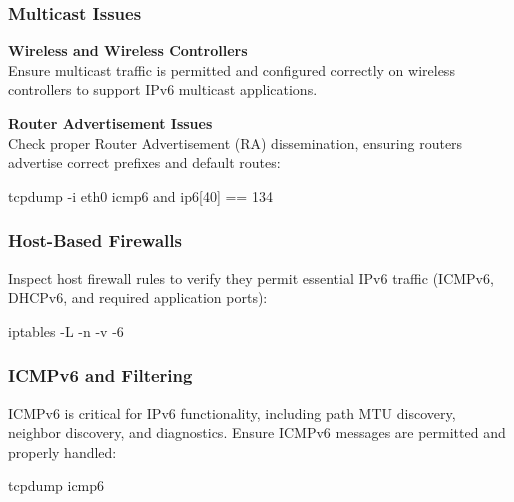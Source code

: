 \documentclass[
]{article}
\newenvironment{Shaded}{}{}
\newcommand{\AttributeTok}[1]{\textcolor[rgb]{0.49,0.56,0.16}{#1}}
\newcommand{\ExtensionTok}[1]{#1}
\newcommand{\NormalTok}[1]{#1}
\newcommand{\PreprocessorTok}[1]{\textcolor[rgb]{0.74,0.48,0.00}{#1}}
\newcommand{\SpecialStringTok}[1]{\textcolor[rgb]{0.73,0.40,0.53}{#1}}
\begin{document}
\subsubsection{Multicast Issues}\label{multicast-issues}

\textbf{Wireless and Wireless Controllers}\\
Ensure multicast traffic is permitted and configured correctly on
wireless controllers to support IPv6 multicast applications.

\textbf{Router Advertisement Issues}\\
Check proper Router Advertisement (RA) dissemination, ensuring routers
advertise correct prefixes and default routes:

\begin{Shaded}
\begin{Highlighting}[]
\ExtensionTok{tcpdump} \AttributeTok{{-}i}\NormalTok{ eth0 icmp6 and ip6}\PreprocessorTok{[}\SpecialStringTok{40}\PreprocessorTok{]}\NormalTok{ == 134}
\end{Highlighting}
\end{Shaded}

\subsubsection{Host-Based Firewalls}\label{host-based-firewalls}

Inspect host firewall rules to verify they permit essential IPv6 traffic
(ICMPv6, DHCPv6, and required application ports):

\begin{Shaded}
\begin{Highlighting}[]
\ExtensionTok{iptables} \AttributeTok{{-}L} \AttributeTok{{-}n} \AttributeTok{{-}v} \AttributeTok{{-}6}
\end{Highlighting}
\end{Shaded}

\subsubsection{ICMPv6 and Filtering}\label{icmpv6-and-filtering}

ICMPv6 is critical for IPv6 functionality, including path MTU discovery,
neighbor discovery, and diagnostics. Ensure ICMPv6 messages are
permitted and properly handled:

\begin{Shaded}
\begin{Highlighting}[]
\ExtensionTok{tcpdump}\NormalTok{ icmp6}
\end{Highlighting}
\end{Shaded}
\end{document}
